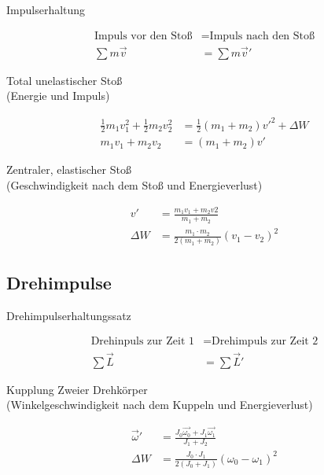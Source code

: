 \begin{boxleft}Impulserhaltung
\end{boxleft}\begin{boxrightshaded}
\begin{align}
\text{Impuls vor den Stoß} &= \text{Impuls nach den Stoß}\nonumber\\
\sum m\vec{v}&= \sum m\vec{v}'
\end{align}
\end{boxrightshaded}

\begin{boxleft}Total unelastischer Stoß\\
(Energie und Impuls)
\end{boxleft}\begin{boxrightshaded}
\begin{align}
\frac{1}{2}m_1v_1^2+\frac{1}{2}m_2v_2^2&=\frac{1}{2}\left(m_1+m_2\right)v'^2+\Delta W\\
m_1v_1+m_2v_2&=\left(m_1+m_2\right)v'
\end{align}
\end{boxrightshaded}

\begin{boxleft}Zentraler, elastischer Stoß\\
(Geschwindigkeit nach dem Stoß und Energieverlust)
\end{boxleft}\begin{boxrightshaded}
\begin{align}
v'		&=\frac{m_1v_1+m_2v2}{m_1+m_2}\\
\Delta W	&=\frac{m_1\cdot m_2}{2\left(m_1+m_2\right)}\left(v_1-v_2\right)^2
\end{align}
\end{boxrightshaded}

\subsection{Drehimpulse}

\begin{boxleft}Drehimpulserhaltungssatz
\end{boxleft}\begin{boxrightshaded}
\begin{align}
\text{Drehinpuls zur Zeit 1} &= \text{Drehimpuls zur Zeit 2}\\
\sum \vec{L}&=\sum \vec{L}'
\end{align}
\end{boxrightshaded}

\begin{boxleft}Kupplung Zweier Drehkörper\\
(Winkelgeschwindigkeit nach dem Kuppeln und Energieverlust)
\end{boxleft}\begin{boxrightshaded}
\begin{align}
\vec{\omega}'&=\frac{J_0\vec{\omega_0}+J_1\vec{\omega_1}}{J_1+J_2}\\
\Delta W&=\frac{J_0\cdot J_1}{2\left(J_0+J_1\right)}\left(\omega_0-\omega_1\right)^2
\end{align}
\end{boxrightshaded}


